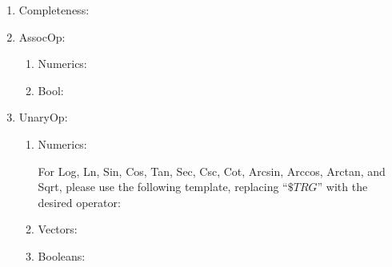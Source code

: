 
\begin{enumerate}

    \item Completeness:
        \newrule{}
            {}
        
        \newrule{}
            {}

    \item AssocOp:
        \begin{enumerate}
            \item Numerics:
                    {}
        
                    {}
    
            \item Bool:
                \newrule{}
                    {}
        
                \newrule{}
                    {}
        \end{enumerate}

    \item UnaryOp:
        \begin{enumerate}
            \item Numerics:
                    {}

                    {}
                
                
                For Log, Ln, Sin, Cos, Tan, Sec, Csc, Cot, Arcsin, Arccos, Arctan, and Sqrt, please use the following template, replacing ``$\$TRG$'' with the desired operator:
                \newrule{}
                    {}

            \item Vectors:
                    {}

                    {}

                    {}
                
            \item Booleans:
                \newrule{}
                    {}


\end{enumerate}
\end{enumerate}
